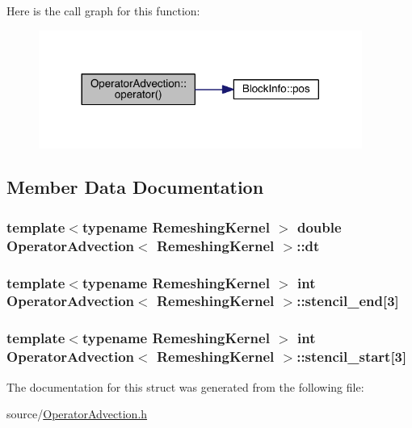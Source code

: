 Here is the call graph for this function\+:\nopagebreak
\begin{figure}[H]
\begin{center}
\leavevmode
\includegraphics[width=300pt]{dc/d83/struct_operator_advection_a15dcc82744e11ed8f0a741e0143dbeac_cgraph}
\end{center}
\end{figure}




\subsection{Member Data Documentation}
\hypertarget{struct_operator_advection_a4a8f1b38860f0d05f233493c70654006}{}
\subsubsection[{dt}]{\setlength{\rightskip}{0pt plus 5cm}template$<$typename Remeshing\+Kernel $>$ double {\bf Operator\+Advection}$<$ Remeshing\+Kernel $>$\+::dt}\label{struct_operator_advection_a4a8f1b38860f0d05f233493c70654006}
\hypertarget{struct_operator_advection_af466cff8bcff47aa746cd5060fe4919d}{}
\subsubsection[{stencil\+\_\+end}]{\setlength{\rightskip}{0pt plus 5cm}template$<$typename Remeshing\+Kernel $>$ int {\bf Operator\+Advection}$<$ Remeshing\+Kernel $>$\+::stencil\+\_\+end\mbox{[}3\mbox{]}}\label{struct_operator_advection_af466cff8bcff47aa746cd5060fe4919d}
\hypertarget{struct_operator_advection_ae312bcebfc0be505d739796831a90648}{}
\subsubsection[{stencil\+\_\+start}]{\setlength{\rightskip}{0pt plus 5cm}template$<$typename Remeshing\+Kernel $>$ int {\bf Operator\+Advection}$<$ Remeshing\+Kernel $>$\+::stencil\+\_\+start\mbox{[}3\mbox{]}}\label{struct_operator_advection_ae312bcebfc0be505d739796831a90648}


The documentation for this struct was generated from the following file\+:\begin{DoxyCompactItemize}
\item 
source/\hyperlink{_operator_advection_8h}{Operator\+Advection.\+h}\end{DoxyCompactItemize}
